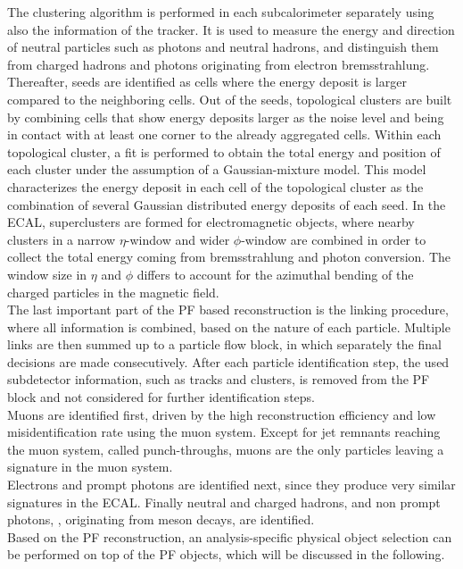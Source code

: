 The clustering algorithm is performed in each subcalorimeter separately using also the information of the tracker. It is used to measure the energy and direction of neutral particles such as photons and neutral hadrons, and distinguish them from charged hadrons and photons originating from electron bremsstrahlung. Thereafter, seeds are identified as cells where the energy deposit is larger compared to the neighboring cells. Out of the seeds, topological clusters are built by combining cells that show energy deposits larger as the noise level and being in contact with at least one corner to the already aggregated cells. Within each topological cluster, a fit is performed to obtain the total energy and position of each cluster under the assumption of a Gaussian-mixture model. This model characterizes the energy deposit in each cell of the topological cluster as the combination of several Gaussian distributed energy deposits of each seed. In the ECAL, superclusters are formed for electromagnetic objects, where nearby clusters in a narrow $\eta$-window and wider $\phi$-window are combined in order to collect the total energy coming from bremsstrahlung and photon conversion. The window size in $\eta$ and $\phi$ differs to account for the azimuthal bending of the charged particles in the magnetic field.\\
The last important part of the PF based reconstruction is the linking procedure, where all information is combined, based on the nature of each particle. Multiple links are then summed up to a particle flow block, in which separately the final decisions are made consecutively. After each particle identification step, the used subdetector information, such as tracks and clusters, is removed from the PF block and not considered for further identification steps.\\
Muons are identified first, driven by the high reconstruction efficiency and low misidentification rate using the muon system. Except for jet remnants reaching the muon system, called punch-throughs, muons are the only particles leaving a signature in the muon system.\\
Electrons and prompt photons are identified next, since they produce very similar signatures in the ECAL. Finally neutral and charged hadrons, and non prompt photons, \eg, originating from meson decays, are identified.\\
Based on the PF reconstruction, an analysis-specific physical object selection can be performed on top of the PF objects, which will be discussed in the following.
















